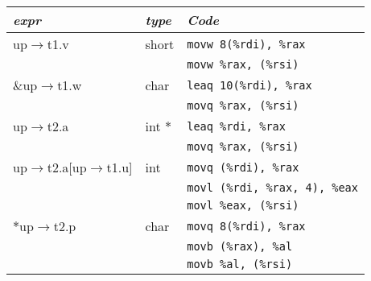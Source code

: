\documentclass{article}
\begin{document}
\begin{tabular}{l l l}
	\textit{expr} & \textit{type} & \textit{Code} \\
	\hline
	up$\rightarrow$t1.v & short & \texttt{movw 8(\%rdi), \%rax} \\
	&&\texttt{movw \%rax, (\%rsi)} \\
	\&up$\rightarrow$t1.w & char & \texttt{leaq 10(\%rdi), \%rax} \\
	&&\texttt{movq \%rax, (\%rsi)} \\
	up$\rightarrow$t2.a & int $*$ & \texttt{leaq \%rdi, \%rax} \\
	&&\texttt{movq \%rax, (\%rsi)} \\
	up$\rightarrow$t2.a[up$\rightarrow$t1.u] & int & \texttt{movq (\%rdi), \%rax} \\
	&& \texttt{movl (\%rdi, \%rax, 4), \%eax} \\
	&& \texttt{movl \%eax, (\%rsi)} \\
	$*$up$\rightarrow$t2.p & char & \texttt{movq 8(\%rdi), \%rax} \\
	&& \texttt{movb (\%rax), \%al} \\
	&& \texttt{movb \%al, (\%rsi)} \\
	\hline
\end{tabular}
\end{document}
